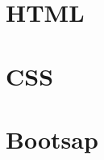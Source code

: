 \documentclass[a4paper]{article}
\begin{document}
\maketitle


\tableofcontents

\section{HTML}

\section{CSS}

\section{Bootsap}
\end{document}
